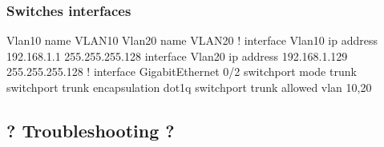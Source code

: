 \subsubsection{Switches interfaces}

\begin{txt}
Vlan10
 name VLAN10
Vlan20
 name VLAN20
!
interface Vlan10
 ip address 192.168.1.1 255.255.255.128
interface Vlan20
 ip address 192.168.1.129 255.255.255.128
!
interface GigabitEthernet 0/2
 switchport mode trunk
 switchport trunk encapsulation dot1q
 switchport trunk allowed vlan 10,20
\end{txt}

\pagebreak


\pagebreak

\subsection{? Troubleshooting ?}

